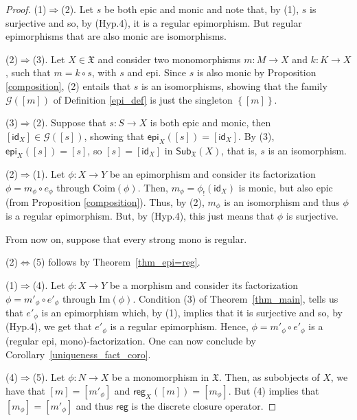 \documentclass[12pt]{article}
\theoremstyle{definition}
\def\X{\mathfrak X}
\def\Coim{\mathrm{Coim}}
\def\G{\mathcal{G}}
\def\Im{\mathrm{Im}}
\numberwithin{equation}{section}
\newcommand{\catname}[1]{\mathbf{#1}}
\newcommand{\sub}[1]{\mathsf{Sub}_{\catname{#1}}}
\newcommand{\id}[1]{\mathsf{id}_{#1}}
\def\epi{\mathsf{epi}}
\def\reg{\mathsf{reg}}
\begin{document}
\begin{proof}
(1)$\Rightarrow$(2). Let $s$ be both epic and monic and note that, by (1), $s$ is surjective and so, by (Hyp.4), it is a regular epimorphism. But regular epimorphisms that are also monic are isomorphisms.

\smallskip\noindent
(2)$\Rightarrow$(3). Let $X\in \X$ and consider two monomorphisms $m\colon M\to X$ and $k\colon K\to X$, such that $m=k\circ s$, with $s$ and epi. Since $s$ is also monic by Proposition \ref{composition}, (2) entails that $s$ is an isomorphisms, showing that the family $\G([m])$ of Definition \ref{epi_def} is just the singleton $\left \{[m]\right \}$. 

\smallskip\noindent
(3)$\Rightarrow$(2). Suppose that $s\colon S\to X$ is both epic and monic, then $[\id{X}]\in \G([s])$, showing that $\epi_X([s])=[\id{X}]$. By (3), $\epi_X([s])=[s]$, so $[s]=[\id{X}]$ in $\sub{\X}(X)$, that is, $s$ is an isomorphism.

\smallskip\noindent
(2)$\Rightarrow$(1). Let $\phi\colon X\to Y$ be an epimorphism and consider its factorization $\phi=m_\phi\circ e_\phi$ through $\Coim(\phi)$. Then, $m_\phi=\phi_{!}(\id{X})$ is monic, but also epic (from Proposition \ref{composition}). Thus, by (2), $m_\phi$ is an isomorphism and thus $\phi$ is a regular epimorphism. But, by (Hyp.4), this just means that $\phi$ is surjective. 

\smallskip\noindent
From now on, suppose that every strong mono is regular.

\smallskip\noindent
(2)$\Leftrightarrow$(5) follows by Theorem~\ref{thm_epi=reg}.

\smallskip\noindent
(1)$\Rightarrow$(4). Let $\phi\colon X\to Y$ be a morphism and consider its factorization $\phi=m'_\phi\circ e'_\phi$ through $\Im(\phi)$. Condition (3) of Theorem~\ref{thm_main}, tells us that $e'_\phi$ is an epimorphism which, by (1), implies that it is surjective and so, by (Hyp.4), we get that $e'_\phi$ is a regular epimorphism. Hence, $\phi=m'_\phi\circ e'_\phi$ is  a (regular epi, mono)-factorization. One can now conclude by Corollary~\ref{uniqueness_fact_coro}.

\smallskip\noindent
(4)$\Rightarrow$(5). Let $\phi\colon N\to X$ be a monomorphism in $\X$. Then, as subobjects of $X$, we have that $[m]=[m'_\phi]$ and $\reg_X([m])=[m_\phi]$. But (4) implies that $[m_\phi]=[m'_\phi]$ and thus $\reg$ is the discrete closure operator.
\end{proof}
\end{document}
